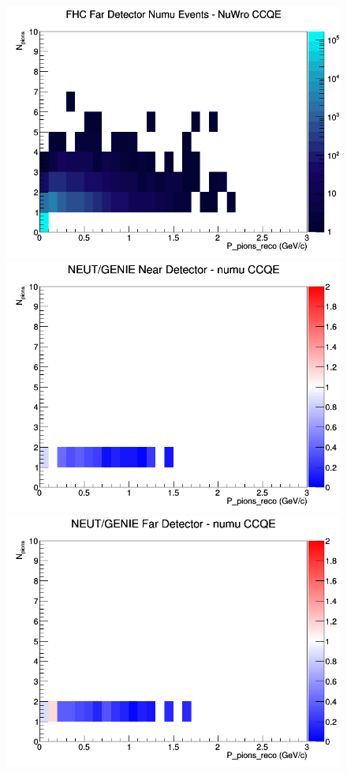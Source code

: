 \documentclass[12pt]{article}
\begin{document}
\begin{figure}[h]
\endminipage
{}
\includegraphics[width=\linewidth]{eff_N_P/LAr/pions/CCQE_FHC_FD_numu_N_P_NuWro.png}
\endminipage
\newline
{}
\includegraphics[width=\linewidth]{eff_N_P/LAr/pions/ratios/CCQE_NEUT_GENIE_numu_near_N_P.png}
\endminipage
{}
\includegraphics[width=\linewidth]{eff_N_P/LAr/pions/ratios/CCQE_NEUT_GENIE_numu_far_N_P.png}

\end{figure}
\end{document}
